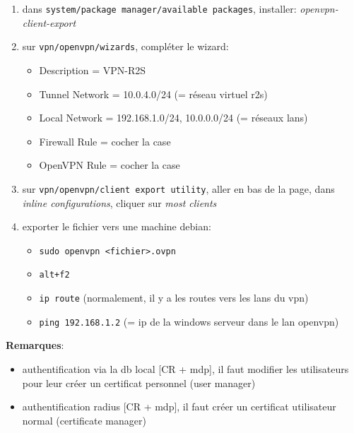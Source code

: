 \documentclass[a4paper]{article}
\begin{document}
\begin{enumerate}
    \item dans \texttt{system/package manager/available packages}, installer: \textit{openvpn-client-export}
    \item sur \texttt{vpn/openvpn/wizards}, compléter le wizard:
    \begin{itemize}
        \item Description = VPN-R2S
        \item Tunnel Network = 10.0.4.0/24 (= réseau virtuel r2s)
        \item Local Network = 192.168.1.0/24, 10.0.0.0/24 (= réseaux lans)
        \item Firewall Rule = cocher la case
        \item OpenVPN Rule = cocher la case
    \end{itemize}
    \item sur \texttt{vpn/openvpn/client export utility}, aller en bas de la page, dans \textit{inline configurations}, cliquer sur \textit{most clients}
    \item exporter le fichier vers une machine debian:
    \begin{itemize}
        \item \texttt{sudo openvpn <fichier>.ovpn}
        \item \texttt{alt+f2}
        \item \texttt{ip route} (normalement, il y a les routes vers les lans du vpn)
        \item \texttt{ping 192.168.1.2} (= ip de la windows serveur dans le lan openvpn)
    \end{itemize}
\end{enumerate}
\textbf{Remarques}:
\begin{itemize}
    \item authentification via la db local [CR + mdp], il faut modifier les utilisateurs pour leur créer un certificat personnel (user manager)
    \item authentification radius [CR + mdp], il faut créer un certificat utilisateur normal (certificate manager)
\end{itemize}




















\newpage \tableofcontents
\end{document}
